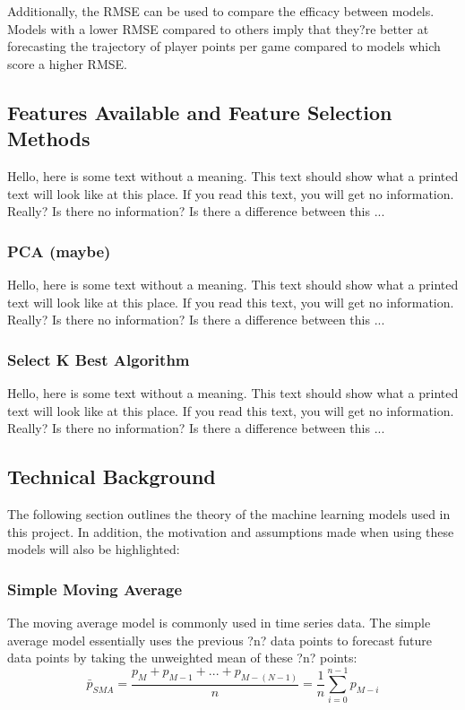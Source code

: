 \documentclass[a4paper,11pt,twoside]{article}
\begin{document}
Additionally, the RMSE can be used to compare the efficacy between models. Models with a lower RMSE compared to others imply that they?re better at forecasting the trajectory of player points per game compared to models which score a higher RMSE.

\subsection{Features Available and Feature Selection Methods}
Hello,  here  is  some  text  without  a  meaning.   This  
text  should  show  what  a printed text will look like at 
this place.  If you read this text, you will get no information.  
Really?  Is there no information?  Is there a difference between 
this ... 

 \subsubsection{PCA (maybe)}
 Hello,  here  is  some  text  without  a  meaning.   This  
text  should  show  what  a printed text will look like at 
this place.  If you read this text, you will get no information.  
Really?  Is there no information?  Is there a difference between 
this ... 

 \subsubsection{Select K Best Algorithm}
 Hello,  here  is  some  text  without  a  meaning.   This  
text  should  show  what  a printed text will look like at 
this place.  If you read this text, you will get no information.  
Really?  Is there no information?  Is there a difference between 
this ... 
\subsection{Technical Background}
 
The following section outlines the theory of the machine learning models used in this project. In addition, the motivation and assumptions made when using these models will also be highlighted:


\subsubsection{Simple Moving Average}
The moving average model is commonly used in time series data. The simple average model essentially uses the previous ?n? data points to forecast future data points by taking the unweighted mean of these ?n? points:
\begin{equation}
\bar{p}_{SMA} = \frac{p_{M} + p_{M-1} + ... + p_{M-(N-1)}} {n} 
= \frac{1}{n} \sum_{i=0}^{n-1}p_{M-i}
\end{equation}
\end{document}
